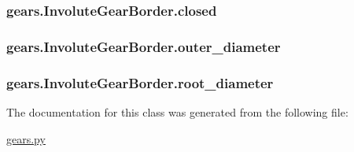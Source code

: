 \subsubsection[{closed}]{\setlength{\rightskip}{0pt plus 5cm}gears.\+Involute\+Gear\+Border.\+closed}\label{classgears_1_1_involute_gear_border_a3082fbde89cd8d0b7d7ab22002fb1eb9}
\hypertarget{classgears_1_1_involute_gear_border_ac7cc57277160a2575a1dbe61fb4b1743}{}
\subsubsection[{outer\+\_\+diameter}]{\setlength{\rightskip}{0pt plus 5cm}gears.\+Involute\+Gear\+Border.\+outer\+\_\+diameter}\label{classgears_1_1_involute_gear_border_ac7cc57277160a2575a1dbe61fb4b1743}
\hypertarget{classgears_1_1_involute_gear_border_a0aabdca00ea7bbd94fb4a922f7948559}{}
\subsubsection[{root\+\_\+diameter}]{\setlength{\rightskip}{0pt plus 5cm}gears.\+Involute\+Gear\+Border.\+root\+\_\+diameter}\label{classgears_1_1_involute_gear_border_a0aabdca00ea7bbd94fb4a922f7948559}


The documentation for this class was generated from the following file\+:\begin{DoxyCompactItemize}
\item 
\hyperlink{gears_8py}{gears.\+py}\end{DoxyCompactItemize}
